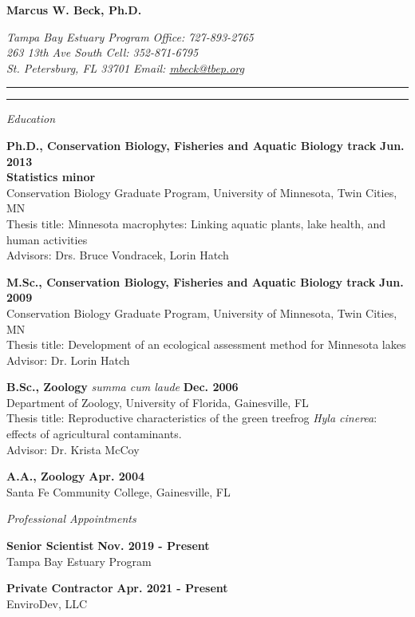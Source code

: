 \documentclass[letterpaper,12pt]{article}
\newcommand{\sectitle}[1]{\vspace{\baselineskip} \centerline{\large{\textit{#1}}}}
\begin{document}
\raggedright

\LARGE
\centerline{{\bf Marcus W. Beck, Ph.D.}}
\normalsize
\textit{Tampa Bay Estuary Program \hfill Office: 727-893-2765 \\
263 13th Ave South \hfill Cell: 352-871-6795 \\
St. Petersburg, FL 33701 \hfill Email: \href{mailto:mbeck@tbep.org}{mbeck@tbep.org}}
\vspace{4pt}
\hrule
\vspace{2pt}
\hrule
\vspace{4pt}

\small

\sectitle{Education}

{\bf Ph.D., Conservation Biology, Fisheries and Aquatic Biology track} \hfill {\bf Jun. 2013} \\
{\bf Statistics minor} \\
Conservation Biology Graduate Program, University of Minnesota, Twin Cities, MN \\
Thesis title: Minnesota macrophytes: Linking aquatic plants, lake health, and human activities \\
Advisors: Drs. Bruce Vondracek, Lorin Hatch

{\bf M.Sc., Conservation Biology, Fisheries and Aquatic Biology track} \hfill {\bf Jun. 2009} \\
Conservation Biology Graduate Program, University of Minnesota, Twin Cities, MN \\
Thesis title: Development of an ecological assessment method for Minnesota lakes\\
Advisor: Dr. Lorin Hatch

{\bf B.Sc., Zoology} \textit{summa cum laude} \hfill {\bf Dec. 2006} \\
Department of Zoology, University of Florida, Gainesville, FL \\
Thesis title: Reproductive characteristics of the green treefrog \textit{Hyla cinerea}: effects of agricultural contaminants. \\
Advisor: Dr. Krista McCoy

{\bf A.A., Zoology} \hfill {\bf Apr. 2004} \\
Santa Fe Community College, Gainesville, FL

\sectitle{Professional Appointments}

{\bf Senior Scientist} \hfill {\bf Nov. 2019 - Present}\\
Tampa Bay Estuary Program

{\bf Private Contractor} \hfill {\bf Apr. 2021 - Present}\\
EnviroDev, LLC
\end{document}
